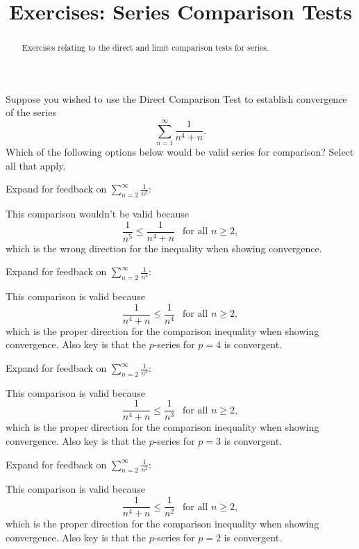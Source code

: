 \documentclass{ximera}
\title{Exercises: Series Comparison Tests}
\begin{document}
\begin{abstract}
Exercises relating to the direct and limit comparison tests for series.
\end{abstract}
\maketitle

\begin{exercise}
Suppose you wished to use the Direct Comparison Test to establish convergence of the series
\[ \sum_{n=1}^\infty \frac{1}{n^4 + n}. \]
Which of the following options below would be valid series for comparison? Select all that apply.
\begin{selectAll}
\end{selectAll}
\begin{feedback}
Expand for feedback on {$\displaystyle \sum_{n=2}^\infty \frac{1}{n^5}$}:
\begin{expandable}
This comparison wouldn't be valid because
\[ \frac{1}{n^5} \leq \frac{1}{n^4+n} \ \ \text{ for all } n \geq 2,\]
which is the wrong direction for the inequality when showing convergence.
\end{expandable}

Expand for feedback on {$\displaystyle \sum_{n=2}^\infty \frac{1}{n^4}$}:
\begin{expandable}
This comparison is valid because
\[ \frac{1}{n^4+n} \leq \frac{1}{n^4}  \ \ \text{ for all } n \geq 2,\]
which is the proper direction for the comparison inequality when showing convergence. Also key is that the $p$-series for $p=4$ is convergent.
\end{expandable}

Expand for feedback on {$\displaystyle \sum_{n=2}^\infty \frac{1}{n^3}$}:
\begin{expandable}
This comparison is valid because
\[ \frac{1}{n^4+n} \leq \frac{1}{n^3}  \ \ \text{ for all } n \geq 2, \]
which is the proper direction for the comparison inequality when showing convergence. Also key is that the $p$-series for $p=3$ is convergent.
\end{expandable}

Expand for feedback on {$\displaystyle \sum_{n=2}^\infty \frac{1}{n^2}$}:
\begin{expandable}
This comparison is valid because
\[ \frac{1}{n^4+n} \leq \frac{1}{n^2}  \ \ \text{ for all } n \geq 2, \]
which is the proper direction for the comparison inequality when showing convergence. Also key is that the $p$-series for $p=2$ is convergent.
\end{expandable}


\end{feedback}
\end{exercise}
\end{document}
